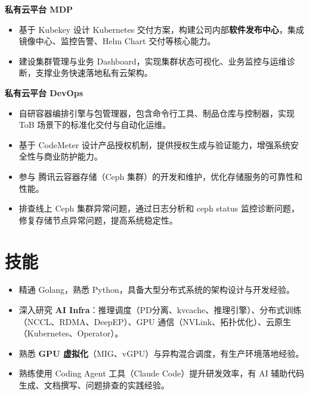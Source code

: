 \documentclass{resume}
\begin{document}
\textbf{私有云平台 MDP}
\begin{itemize}[parsep=0.5ex]
  \item 基于 Kubekey 设计 Kubernetes 交付方案，构建公司内部\textbf{软件发布中心}，集成镜像中心、监控告警、Helm Chart 交付等核心能力。
  \item 建设集群管理与业务 Dashboard，实现集群状态可视化、业务监控与运维诊断，支撑业务快速落地私有云架构。
\end{itemize}

\textbf{私有云平台 DevOps}
\begin{itemize}[parsep=0.5ex]
  \item 自研容器编排引擎与包管理器，包含命令行工具、制品仓库与控制器，实现 ToB 场景下的标准化交付与自动化运维。
  \item 基于 CodeMeter 设计产品授权机制，提供授权生成与验证能力，增强系统安全性与商业防护能力。
\end{itemize}

\begin{itemize}[parsep=0.5ex]
  \item 参与 腾讯云容器存储（Ceph 集群）的开发和维护，优化存储服务的可靠性和性能。
  \item 排查线上 Ceph 集群异常问题，通过日志分析和 ceph status 监控诊断问题，修复存储节点异常问题，提高系统稳定性。
\end{itemize}


\section{技能}
\begin{itemize}[parsep=0.5ex]
  \item 精通 Golang，熟悉 Python，具备大型分布式系统的架构设计与开发经验。
  \item 深入研究 \textbf{AI Infra}：推理调度（PD分离、kvcache、推理引擎）、分布式训练（NCCL、RDMA、DeepEP）、GPU 通信（NVLink、拓扑优化）、云原生（Kubernetes、Operator）。
  \item 熟悉 \textbf{GPU 虚拟化}（MIG、vGPU）与异构混合调度，有生产环境落地经验。
  \item 熟练使用 Coding Agent 工具（Claude Code）提升研发效率，有 AI 辅助代码生成、文档撰写、问题排查的实践经验。
\end{itemize}
\end{document}
